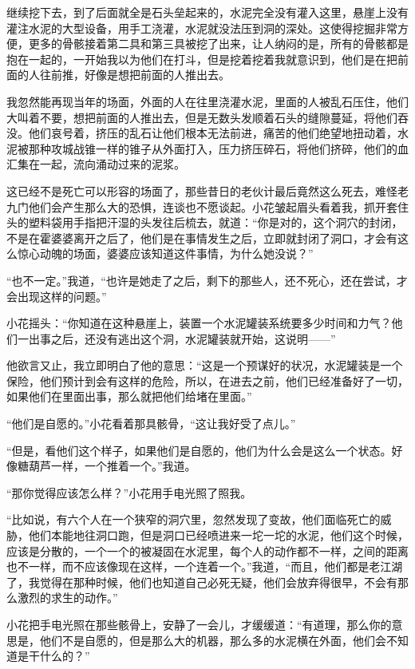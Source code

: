 继续挖下去，到了后面就全是石头垒起来的，水泥完全没有灌入这里，悬崖上没有灌注水泥的大型设备，用手工浇灌，水泥就没法压到洞的深处。这使得挖掘非常方便，更多的骨骸接着第二具和第三具被挖了出来，让人纳闷的是，所有的骨骸都是抱在一起的，一开始我以为他们在打斗，但是挖着挖着我就意识到，他们是在把前面的人往前推，好像是想把前面的人推出去。

我忽然能再现当年的场面，外面的人在往里浇灌水泥，里面的人被乱石压住，他们大叫着不要，想把前面的人推出去，但是无数头发顺着石头的缝隙蔓延，将他们吞没。他们哀号着，挤压的乱石让他们根本无法前进，痛苦的他们绝望地扭动着，水泥被那种攻城战锥一样的锥子从外面打入，压力挤压碎石，将他们挤碎，他们的血汇集在一起，流向涌动过来的泥浆。

这已经不是死亡可以形容的场面了，那些昔日的老伙计最后竟然这么死去，难怪老九门他们会产生那么大的恐惧，连谈也不愿谈起。小花皱起眉头看着我，抓开套住头的塑料袋用手指把汗湿的头发往后梳去，就道：“你是对的，这个洞穴的封闭，不是在霍婆婆离开之后了，他们是在事情发生之后，立即就封闭了洞口，才会有这么惊心动魄的场面，婆婆应该知道这件事情，为什么她没说？”

“也不一定。”我道，“也许是她走了之后，剩下的那些人，还不死心，还在尝试，才会出现这样的问题。”

小花摇头：“你知道在这种悬崖上，装置一个水泥罐装系统要多少时间和力气？他们一出事之后，还没有逃出这个洞，水泥罐装就开始，这说明——”

他欲言又止，我立即明白了他的意思：“这是一个预谋好的状况，水泥罐装是一个保险，他们预计到会有这样的危险，所以，在进去之前，他们已经准备好了一切，如果他们在里面出事，那么就把他们给堵在里面。”

“他们是自愿的。”小花看着那具骸骨，“这让我好受了点儿。”

“但是，看他们这个样子，如果他们是自愿的，他们为什么会是这么一个状态。好像糖葫芦一样，一个推着一个。”我道。

“那你觉得应该怎么样？”小花用手电光照了照我。

“比如说，有六个人在一个狭窄的洞穴里，忽然发现了变故，他们面临死亡的威胁，他们本能地往洞口跑，但是洞口已经喷进来一坨一坨的水泥，他们这个时候，应该是分散的，一个一个的被凝固在水泥里，每个人的动作都不一样，之间的距离也不一样，而不应该像现在这样，一个连着一个。”我道，“而且，他们都是老江湖了，我觉得在那种时候，他们也知道自己必死无疑，他们会放弃得很早，不会有那么激烈的求生的动作。”

小花把手电光照在那些骸骨上，安静了一会儿，才缓缓道：“有道理，那么你的意思是，他们不是自愿的，但是那么大的机器，那么多的水泥横在外面，他们会不知道是干什么的？”

